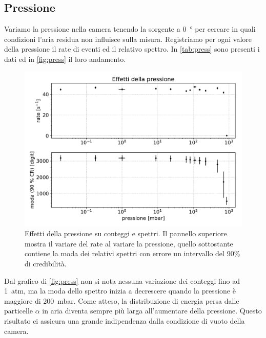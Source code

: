 \subsection{Pressione}

Variamo la pressione nella camera tenendo la sorgente a \SI{0}{\degree} per cercare in quali condizioni l'aria residua non influisce sulla misura.
Registriamo per ogni valore della pressione il rate di eventi ed il relativo spettro. In \autoref{tab:press} sono presenti i dati ed in \autoref{fig:press} il loro andamento.



\begin{figure}[h]
\centering
\includegraphics[width=30 em]{immagini/press}
\caption{Effetti della pressione su conteggi e spettri. Il pannello superiore mostra il variare del rate al variare la pressione, quello sottostante contiene la moda dei relativi spettri con errore un intervallo del 90\% di credibilità.}
\label{fig:press}
\end{figure}


Dal grafico di \autoref{fig:press} non si nota nessuna variazione dei conteggi fino ad \SI{1}{atm}, ma la moda dello spettro inizia a decrescere quando la pressione è maggiore di \SI{200}{mbar}. 
Come atteso, la distribuzione di energia persa dalle particelle $\alpha$ in aria diventa sempre più larga all'aumentare della pressione.
Questo risultato ci assicura una grande indipendenza dalla condizione di vuoto della camera. 


